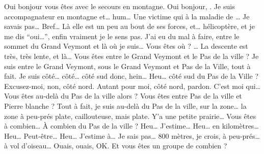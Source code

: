 \begin{dialogue}
  \Sec Oui bonjour vous êtes avec le secours en montagne.
  \Req Oui bonjour, . Je suis accompagnateur en
  montagne et… hum… Une victime qui à la maladie de
  … Je savais pas… Bref… Là elle est un peu au bout de
  ses forces, et…  hélicoptère, et je me dis
  \enquote{oui…}, enfin vraiment je le sens pas. J'ai eu du mal à
  faire, entre le sommet du Grand Veymont et là où je suis…
  \Sec {} Vous êtes où ?
  \Req … La descente est très, très lente, et là…
  \Sec Vous êtes entre le Grand Veymont et le Pas de la ville ?
  \Req Je suis entre le Grand Veymont, sous le Grand Veymont et Pas de
  la Ville, tout à fait. Je suis côté… côté… côté sud donc, hein…
  \Sec Heu… côté sud du Pas de la Ville ?
  \Req Excusez-moi, non, côté nord. Autant pour moi, côté nord,
  pardon. C'est moi qui…
  \Sec Vous êtes au-delà du Pas de la ville alors ? Vous êtes entre
  Pas de la ville et Pierre blanche ?
  \Req Tout à fait, je suis au-delà du Pas de la ville, sur la zone…
  la zone à peu-prés plate, caillouteuse, mais plate. Y'a une petite
  prairie…
  \Sec Vous êtes à combien… À combien du Pas de la ville ?
  \Req Heu… J'estime… Heu… en kilomètres… Heu… Peut-être… Heu…
  J'estime à… Je sais pas… 800 mètres, je crois, à peu-prés… à vol
  d'oiseau…
  \Sec Ouais, ouais, OK. Et vous êtes un groupe de combien ?
\end{dialogue}